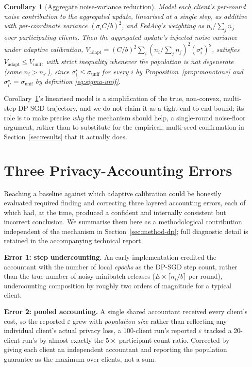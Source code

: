 \documentclass[journal]{IEEEtran}
\newtheorem{corollary}{Corollary}
\begin{document}
\begin{corollary}[Aggregate noise-variance reduction]
\label{cor:variance}
Model each client's per-round noise contribution to the aggregated
update, linearised at a single step, as additive with per-coordinate
variance $(\sigma_i C/b)^2$, and FedAvg's weighting as
$n_i/\sum_j n_j$ over participating clients. Then the aggregated
update's injected noise variance under adaptive calibration,
$V_{\mathrm{adapt}} = (C/b)^2\sum_i (n_i/\sum_j n_j)^2 (\sigma_i^\star)^2$,
satisfies $V_{\mathrm{adapt}} \le V_{\mathrm{unif}}$, with strict
inequality whenever the population is not degenerate (some $n_i >
n_{i^\star}$), since $\sigma_i^\star \le \sigma_{\mathrm{unif}}$ for
every $i$ by Proposition~\ref{prop:monotone} and
$\sigma_{i^\star}^\star = \sigma_{\mathrm{unif}}$ by definition
\eqref{eq:sigma-unif}.
\end{corollary}

Corollary~\ref{cor:variance}'s linearised model is a simplification of
the true, non-convex, multi-step DP-SGD trajectory, and we do not claim
it as a tight end-to-end bound; its role is to make precise \emph{why}
the mechanism should help, a single-round noise-floor argument,
rather than to substitute for the empirical, multi-seed confirmation in
Section~\ref{sec:results} that it actually does.

\section{Three Privacy-Accounting Errors}
\label{sec:accounting-bugs}

Reaching a baseline against which adaptive calibration could be
honestly evaluated required finding and correcting three layered
accounting errors, each of which had, at the time, produced a
confident and internally consistent but incorrect conclusion. We
summarise them here as a methodological contribution independent of
the mechanism in Section~\ref{sec:method-dp}; full diagnostic detail is
retained in the accompanying technical report.

\textbf{Error 1: step undercounting.} An early implementation credited
the accountant with the number of local \emph{epochs} as the DP-SGD
step count, rather than the true number of noisy minibatch releases
($E\times\lceil n_i/b\rceil$ per round), undercounting composition by
roughly two orders of magnitude for a typical client.

\textbf{Error 2: pooled accounting.} A single shared accountant
received every client's cost, so the reported $\varepsilon$ grew with
\emph{population size} rather than reflecting any individual client's
actual privacy loss, a 100-client run's reported $\varepsilon$ tracked
a 20-client run's by almost exactly the $5\times$ participant-count
ratio. Corrected by giving each client an independent accountant and
reporting the population guarantee as the maximum over clients, not a
sum.
\end{document}
